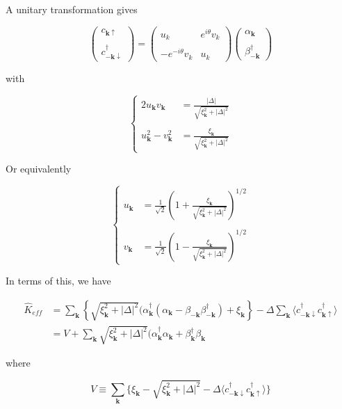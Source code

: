 ﻿\documentclass[twoside]{book}
\numberwithin{equation}{section}
\begin{document}
A unitary transformation gives

\[
\left(\begin{matrix}
c_{\bm{k}\uparrow}\\
\ \\
c_{-\bm{k}\downarrow}^\dagger
\end{matrix}\right) 
= \left(\begin{matrix}
u_k & e^{i\theta}v_k\\
\ & \ \\
-e^{-i\theta}v_k & u_k
\end{matrix}\right) \left(\begin{matrix}
\alpha_{\bm{k}}\\
\ \\
\beta_{-\bm{k}}^\dagger
\end{matrix}\right)  \]

with

\[
\begin{cases}
2u_{\bm{k}}v_{\bm{k}} &= \displaystyle\frac{|\Delta|}{\sqrt{\xi_{\bm{k}}^2+|\Delta|^2}}\\
\ & \ \\
u_{\bm{k}}^2-v_{\bm{k}}^2 &= \displaystyle\frac{\xi_{\bm{k}}}{\sqrt{\xi_{\bm{k}}^2+|\Delta|^2}}
\end{cases}\]

Or equivalently

\[
\begin{cases}
u_{\bm{k}} &= \displaystyle\frac{1}{\sqrt{2}}\left(1+\frac{\xi_{\bm{k}}}{\sqrt{\xi_{\bm{k}}^2+|\Delta|^2}}\right)^{1/2}\\
\ & \ \\
v_{\bm{k}} &= \displaystyle\frac{1}{\sqrt{2}}\left(1-\frac{\xi_{\bm{k}}}{\sqrt{\xi_{\bm{k}}^2+|\Delta|^2}}\right)^{1/2}
\end{cases}
\]

In terms of this, we have

\[\begin{split}
\hat{K}_{eff}&=\sum_{\bm{k}}\left\{\sqrt{\xi_{\bm{k}}^2+|\Delta|^2}(\alpha_{\bm{k}}^\dagger(\alpha_{\bm{k}}-\beta_{-\bm{k}}\beta_{-\bm{k}}^\dagger)+\xi_{\bm{k}}\right\}- \Delta\sum_{\bm{k}}\langle c_{-\bm{k}\downarrow}^\dagger c_{\bm{k}\uparrow}^\dagger\rangle\\
&= V+\sum_{\bm{k}}\sqrt{\xi_{\bm{k}}^2+|\Delta|^2}(\alpha_{\bm{k}}^\dagger\alpha_{\bm{k}}+\beta_{\bm{k}}^\dagger\beta_{\bm{k}}
\end{split}\]

where

\[V \equiv\sum_{\bm{k}}\{\xi_{\bm{k}}-\sqrt{\xi_{\bm{k}}^2+|\Delta|^2}-\Delta\langle c_{-\bm{k}\downarrow}^\dagger c_{\bm{k}\uparrow}^\dagger\rangle\} \]
\end{document}

